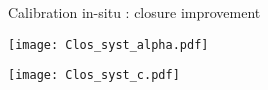 \begin{frame}{Calibration in-situ : closure improvement}
    \begin{minipage}{0.49\linewidth}
\texttt{[image: Clos\_syst\_alpha.pdf]}
  \end{minipage}
  \hfill
  \begin{minipage}{0.49\linewidth}
\texttt{[image: Clos\_syst\_c.pdf]}
  \end{minipage}\\
\end{frame}
